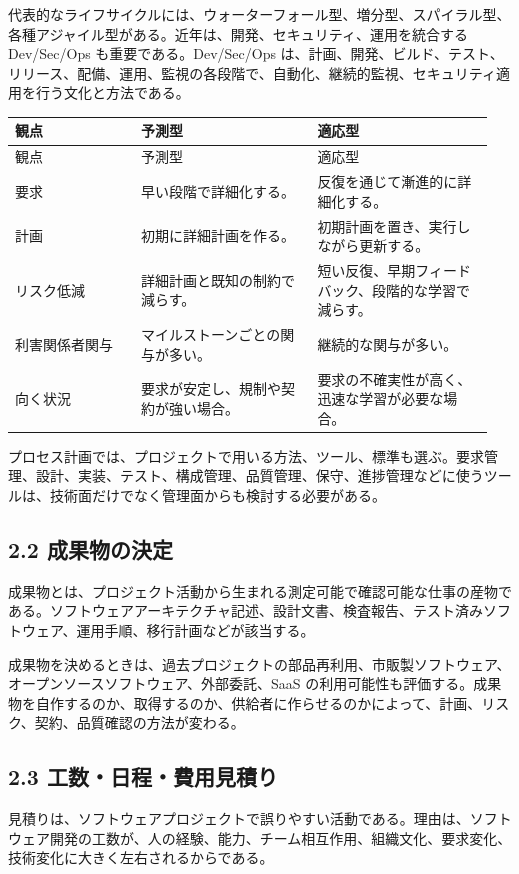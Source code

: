 \documentclass[a4paper,11pt]{ltjsarticle}
\begin{document}
代表的なライフサイクルには、ウォーターフォール型、増分型、スパイラル型、各種アジャイル型がある。近年は、開発、セキュリティ、運用を統合する Dev/Sec/Ops も重要である。Dev/Sec/Ops は、計画、開発、ビルド、テスト、リリース、配備、運用、監視の各段階で、自動化、継続的監視、セキュリティ適用を行う文化と方法である。

\begin{longtable}{>{\raggedright\arraybackslash}p{0.25\linewidth}>{\raggedright\arraybackslash}p{0.35\linewidth}>{\raggedright\arraybackslash}p{0.35\linewidth}}
\toprule
観点 & 予測型 & 適応型 \\
\midrule
\endfirsthead
\toprule
観点 & 予測型 & 適応型 \\
\midrule
\endhead
要求 & 早い段階で詳細化する。 & 反復を通じて漸進的に詳細化する。 \\
計画 & 初期に詳細計画を作る。 & 初期計画を置き、実行しながら更新する。 \\
リスク低減 & 詳細計画と既知の制約で減らす。 & 短い反復、早期フィードバック、段階的な学習で減らす。 \\
利害関係者関与 & マイルストーンごとの関与が多い。 & 継続的な関与が多い。 \\
向く状況 & 要求が安定し、規制や契約が強い場合。 & 要求の不確実性が高く、迅速な学習が必要な場合。 \\
\bottomrule
\end{longtable}

プロセス計画では、プロジェクトで用いる方法、ツール、標準も選ぶ。要求管理、設計、実装、テスト、構成管理、品質管理、保守、進捗管理などに使うツールは、技術面だけでなく管理面からも検討する必要がある。

\subsection{2.2 成果物の決定}
成果物とは、プロジェクト活動から生まれる測定可能で確認可能な仕事の産物である。ソフトウェアアーキテクチャ記述、設計文書、検査報告、テスト済みソフトウェア、運用手順、移行計画などが該当する。

成果物を決めるときは、過去プロジェクトの部品再利用、市販製ソフトウェア、オープンソースソフトウェア、外部委託、SaaS の利用可能性も評価する。成果物を自作するのか、取得するのか、供給者に作らせるのかによって、計画、リスク、契約、品質確認の方法が変わる。

\subsection{2.3 工数・日程・費用見積り}
見積りは、ソフトウェアプロジェクトで誤りやすい活動である。理由は、ソフトウェア開発の工数が、人の経験、能力、チーム相互作用、組織文化、要求変化、技術変化に大きく左右されるからである。
\end{document}

